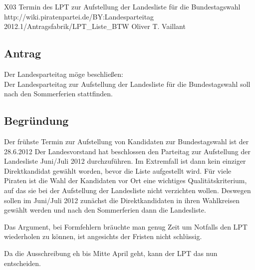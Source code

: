 \sonstigerantrag
{X03}
{Termin des LPT zur Aufstellung der Landesliste für die Bundestagswahl}
{http://wiki.piratenpartei.de/BY:Landesparteitag 2012.1/Antragsfabrik/LPT_Liste_BTW}
{Oliver T. Vaillant}

\subsection{Antrag}
Der Landesparteitag möge beschließen:\\
Der Landesparteitag zur Aufstellung der Landesliste für die Bundestagswahl soll nach den
Sommerferien stattfinden.

\subsection{Begründung}
Der frühste Termin zur Aufstellung von Kandidaten zur Bundestagswahl ist der 28.6.2012 Der
Landesvorstand hat beschlossen den Parteitag zur Aufstellung der Landesliste Juni/Juli 2012
durchzuführen. Im Extremfall ist dann kein einziger Direktkandidat gewählt worden, bevor die
Liste aufgestellt wird. Für viele Piraten ist die Wahl der Kandidaten vor Ort eine wichtiges
Qualitätskriterium, auf das sie bei der Aufstellung der Landesliste nicht verzichten wollen.
Deswegen sollen im Juni/Juli 2012 zunächst die Direktkandidaten in ihren Wahlkreisen gewählt
werden und nach den Sommerferien dann die Landesliste.\par
Das Argument, bei Formfehlern bräuchte man genug Zeit um Notfalls den LPT wiederholen zu
können, ist angesichts der Fristen nicht schlüssig.\par
Da die Ausschreibung eh bis Mitte April geht, kann der LPT das nun entscheiden.
